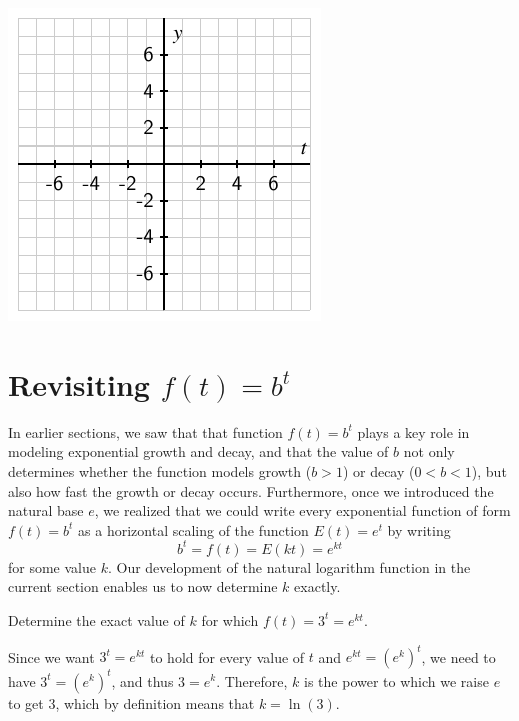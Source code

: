\documentclass[nooutcomes]{ximera}
\begin{document}
\begin{exploration}
\begin{enumerate}[label=\alph*.]
\includegraphics[width=1\linewidth]{images/exp-log-blank-axes}

\end{enumerate}
%
\end{exploration}
%
%
%
\section{Revisiting $f(t) = b^t$}

In earlier sections, we saw that that function \(f(t) = b^t\) plays a key role in modeling exponential growth and decay, and that the value of \(b\) not only determines whether the function models growth (\(b \gt 1\)) or decay (\(0 \lt b \lt 1\)), but also how fast the growth or decay occurs.  Furthermore, once we introduced the natural base \(e\), we realized that we could write every exponential function of form \(f(t) = b^t\) as a horizontal scaling of the function \(E(t) = e^t\) by writing%
\begin{equation*}
b^t = f(t) = E(kt) = e^{kt}
\end{equation*}
for some value \(k\).  Our development of the natural logarithm function in the current section enables us to now determine \(k\) exactly.%
\begin{example}

Determine the exact value of \(k\) for which \(f(t) = 3^t = e^{kt}\).%

\begin{explanation} Since we want \(3^t = e^{kt}\) to hold for every value of \(t\) and \(e^{kt} = (e^k)^t\), we need to have \(3^t = (e^k)^t\), and thus \(3 = e^k\).  Therefore, \(k\) is the power to which we raise \(e\) to get \(3\), which by definition means that \(k = \ln(3)\).%
\end{explanation}
\end{example}
\end{document}
